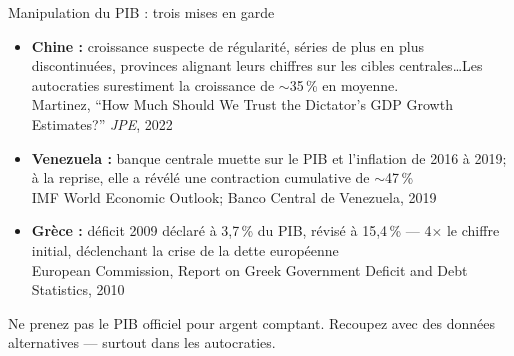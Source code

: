 \documentclass[aspectratio=169]{beamer}
\begin{document}
\begin{frame}[t]{Manipulation du PIB : trois mises en garde}
   \small
   \begin{itemize}
      \setlength\itemsep{0.1cm}
      \item \textbf{Chine :} croissance suspecte de r\'egularit\'e, s\'eries de plus en plus discontinu\'ees, provinces alignant leurs chiffres sur les cibles centrales\ldots Les autocraties surestiment la croissance de $\sim$35\,\% en moyenne.
         \\{\scriptsize\textcolor{HECgray}{Martinez, ``How Much Should We Trust the Dictator's GDP Growth Estimates?'' \textit{JPE}, 2022}}
      \item \textbf{Venezuela :} banque centrale muette sur le PIB et l'inflation de 2016 \`a 2019; \`a la reprise, elle a r\'ev\'el\'e une contraction cumulative de $\sim$47\,\%
         \\{\scriptsize\textcolor{HECgray}{IMF World Economic Outlook; Banco Central de Venezuela, 2019}}
      \item \textbf{Gr\`ece :} d\'eficit 2009 d\'eclar\'e \`a 3,7\,\% du PIB, r\'evis\'e \`a 15,4\,\% --- 4$\times$ le chiffre initial, d\'eclenchant la crise de la dette europ\'eenne
         \\{\scriptsize\textcolor{HECgray}{European Commission, Report on Greek Government Deficit and Debt Statistics, 2010}}
   \end{itemize}
   \begin{bizimplication}
      \footnotesize Ne prenez pas le PIB officiel pour argent comptant. Recoupez avec des donn\'ees alternatives --- surtout dans les autocraties.
   \end{bizimplication}
\end{frame}
\end{document}
